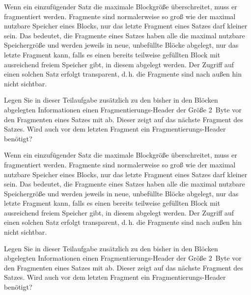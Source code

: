 \begin{enumerate}[a)]
\begin{normalText}
	Wenn ein einzufügender Satz die maximale Blockgröße überschreitet, muss er fragmentiert werden. Fragmente sind normalerweise so groß wie der maximal nutzbare Speicher eines Blocks, nur das letzte Fragment eines Satzes darf kleiner sein. Das bedeutet, die Fragmente eines Satzes haben alle die maximal nutzbare Speichergröße und werden jeweils in neue, unbefüllte Blöcke abgelegt, nur das letzte Fragment kann, falls es einen bereits teilweise gefüllten Block mit ausreichend freiem Speicher gibt, in diesem abgelegt werden. Der Zugriff auf einen solchen Satz erfolgt transparent, d.\,h. die Fragmente sind nach außen hin nicht sichtbar.

	Legen Sie in dieser Teilaufgabe zusätzlich zu den bisher in den Blöcken abgelegten Informationen einen Fragmentierungs-Header der Größe 2~Byte vor den Fragmenten eines Satzes mit ab. Dieser zeigt auf das nächste Fragment des Satzes. Wird auch vor dem letzten Fragment ein Fragmentierungs-Header benötigt?
\end{normalText}

	\begin{center}
	\end{center}

\begin{beamerText}
	\pagebreak
	Wenn ein einzufügender Satz die maximale Blockgröße überschreitet, muss er fragmentiert werden. Fragmente sind normalerweise so groß wie der maximal nutzbare Speicher eines Blocks, nur das letzte Fragment eines Satzes darf kleiner sein. Das bedeutet, die Fragmente eines Satzes haben alle die maximal nutzbare Speichergröße und werden jeweils in neue, unbefüllte Blöcke abgelegt, nur das letzte Fragment kann, falls es einen bereits teilweise gefüllten Block mit ausreichend freiem Speicher gibt, in diesem abgelegt werden. Der Zugriff auf einen solchen Satz erfolgt transparent, d.\,h. die Fragmente sind nach außen hin nicht sichtbar.

	Legen Sie in dieser Teilaufgabe zusätzlich zu den bisher in den Blöcken abgelegten Informationen einen Fragmentierungs-Header der Größe 2~Byte vor den Fragmenten eines Satzes mit ab. Dieser zeigt auf das nächste Fragment des Satzes. Wird auch vor dem letzten Fragment ein Fragmentierungs-Header benötigt?
\end{beamerText}


\end{enumerate}
